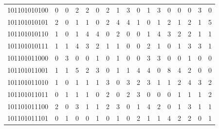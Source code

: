 \documentclass[10pt,a4paper]{article}
\begin{document}
\begin{longtable}{ |c|c|c|c|c|c|c|c|c|c|c|c|c|c|c|c|c| }
    101101010100              & 0                            & 0                                & 2                            & 2                              & 0   & 2   & 1   & 3   & 0   & 1   & 3   & 0   & 0   & 0   & 3   & 0   \\
    101101010101              & 2                            & 0                                & 1                            & 1                              & 0   & 2   & 4   & 4   & 1   & 0   & 1   & 2   & 1   & 2   & 1   & 5   \\
    101101010110              & 1                            & 0                                & 1                            & 4                              & 4   & 0   & 2   & 0   & 0   & 1   & 4   & 3   & 2   & 2   & 1   & 1   \\
    101101010111              & 1                            & 1                                & 4                            & 3                              & 2   & 1   & 1   & 0   & 0   & 2   & 1   & 0   & 1   & 3   & 3   & 1   \\
    101101011000              & 0                            & 3                                & 0                            & 0                              & 1   & 0   & 1   & 0   & 0   & 3   & 3   & 0   & 0   & 1   & 0   & 0   \\
    101101011001              & 1                            & 1                                & 5                            & 2                              & 3   & 0   & 1   & 1   & 4   & 4   & 0   & 8   & 4   & 2   & 0   & 0   \\
    101101011010              & 1                            & 0                                & 1                            & 1                              & 1   & 3   & 0   & 3   & 2   & 3   & 1   & 1   & 2   & 4   & 3   & 2   \\
    101101011011              & 0                            & 1                                & 1                            & 1                              & 0   & 2   & 0   & 2   & 3   & 0   & 0   & 0   & 1   & 1   & 1   & 2   \\
    101101011100              & 2                            & 0                                & 3                            & 1                              & 1   & 2   & 3   & 0   & 1   & 4   & 2   & 0   & 1   & 3   & 1   & 1   \\
    101101011101              & 0                            & 1                                & 0                            & 0                              & 1   & 0   & 1   & 0   & 2   & 1   & 1   & 4   & 2   & 2   & 0   & 1   \\

\end{longtable}
\end{document}
